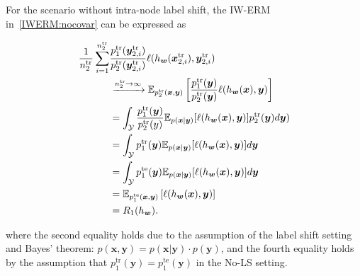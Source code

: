 For the scenario without intra-node label shift, the IW-ERM in~\cref{IWERM:nocovar} can be expressed as

\begin{align}\label{equ1} 
\begin{split}
\frac{1}{n_2^{\text{tr}}}\sum_{i=1}^{n_2^{\text{tr}}}& \frac{p_1^{\text{tr}}(\boldsymbol{y}_{2,i}^{\text{tr}})}{p_2^{\text{tr}}(\boldsymbol{y}_{2,i}^{\text{tr}})}\ell(h_{\boldsymbol{w}}(\boldsymbol{x}_{2,i}^{\text{tr}}),{\boldsymbol{y}}_{2,i}^{\text{tr}})\\
&\xrightarrow{n_2^{\text{tr}}\rightarrow \infty}
\mathbb{E}_{p_2^{\text{tr}}(\boldsymbol{x},\boldsymbol{y})} \left[\frac{p_1^{\text{tr}}(\boldsymbol{y})}{p_2^{\text{tr}}(\boldsymbol{y})}\ell(h_{\boldsymbol{w}}(\boldsymbol{x}),\boldsymbol{y}) \right] \\
&= \int_{\mathcal{Y}}\frac{p_1^{\text{tr}}(\boldsymbol{y})}{p_2^{\text{tr}}(y)}\mathbb{E}_{p(\boldsymbol{x}|\boldsymbol{y})}[\ell(h_{\boldsymbol{w}}(\boldsymbol{x}),\boldsymbol{y})]p_2^{\text{tr}}(\boldsymbol{y}){d}\boldsymbol{y})  \\
&= \int_{\mathcal{Y}}p_1^{\text{tr}}(\boldsymbol{y})\mathbb{E}_{p(\boldsymbol{x}|\boldsymbol{y})}[\ell(h_{\boldsymbol{w}}(\boldsymbol{x}),\boldsymbol{y})]{d}\boldsymbol{y}\\
&= \int_{\mathcal{Y}}p_1^{\text{te}}(\boldsymbol{y})\mathbb{E}_{p(\boldsymbol{x}|\boldsymbol{y})}[\ell(h_{\boldsymbol{w}}(\boldsymbol{x}),\boldsymbol{y})]{d}\boldsymbol{y}\\
&= \mathbb{E}_{p_1^{\text{te}}(\boldsymbol{x},\boldsymbol{y})} \left[\ell(h_{\boldsymbol{w}}(\boldsymbol{x}),\boldsymbol{y}) \right]\\
&= R_1(h_{\boldsymbol{w}}).
\end{split}
\end{align}

where the second equality holds due to the assumption of the label shift setting and Bayes' theorem: $p(\boldsymbol{x},\boldsymbol{y})=p(\boldsymbol{x}|\boldsymbol{y})\cdot p(\boldsymbol{y})$, and the fourth equality holds by the assumption that $p_1^{\text{tr}}(\boldsymbol{y})=p_1^{\text{te}}(\boldsymbol{y})$ in the No-LS setting.



